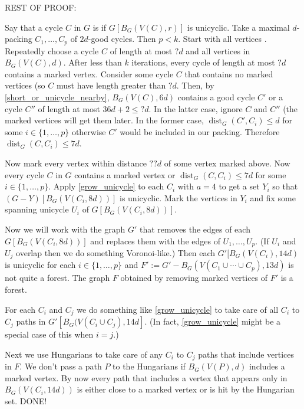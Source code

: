 \documentclass{patmorin}
\DeclareMathOperator{\dist}{dist}
\begin{document}
REST OF PROOF:

Say that a cycle $C$ in $G$ is  if $G[B_G(V(C),r)]$ is unicyclic.  Take a maximal $d$-packing $C_1,\ldots,C_p$ of $2d$-good cycles.  Then $p< k$. Start with all vertices .  Repeatedly choose a cycle $C$ of length at most $?d$ and  all vertices in $B_G(V(C),d)$.  After less than $k$ iterations, every cycle of length at most $?d$ contains a marked vertex.  Consider some cycle $C$ that contains no marked vertices (so $C$ must have length greater than $?d$.  Then, by \cref{short_or_unicycle_nearby}, $B_G(V(C),6d)$ contains a good cycle $C'$ or a cycle $C''$ of length at most $36d+2\le ?d$.  In the latter case, ignore $C$ and $C''$ (the marked vertices will get them later.  In the former case, $\dist_G(C',C_i)\le d$ for some $i\in\{1,\ldots,p\}$ otherwise $C'$ would be included in our packing.  Therefore $\dist_G(C,C_i)\le 7d$.

Now mark every vertex within distance $??d$ of some vertex marked above.  Now every cycle $C$ in $G$ contains a marked vertex or $\dist_G(C,C_i)\le 7d$ for some $i\in\{1,\ldots,p\}$.  Apply \cref{grow_unicycle} to each $C_i$ with $a=4$ to get a set $Y_i$ so that $(G-Y)[B_G(V(C_i,8d))]$ is unicyclic.  Mark the vertices in $Y_i$ and fix some spanning unicycle $U_i$ of $G[B_G(V(C_i,8d))]$.

Now we will work with the graph $G'$ that removes the edges of each $G[B_G(V(C_i,8d))]$ and replaces them with the edges of $U_1,\ldots,U_p$.  (If $U_i$ and $U_j$ overlap then we do something Voronoi-like.)  Then each $G'[B_G(V(C_i),14d)$ is unicyclic for each $i\in\{1,\ldots,p\}$ and $F':=G'-B_G(V(C_1\cup\cdots\cup C_p),13d)$ is not quite a forest. The graph $F$ obtained by removing marked vertices of $F'$ is a forest.

For each $C_i$ and $C_j$ we do something like \cref{grow_unicycle} to take care of all $C_i$ to $C_j$ paths in $G'[B_G(V(C_i\cup C_j),14d]$.  (In fact, \cref{grow_unicycle} might be a special case of this when $i=j$.)

Next we use Hungarians to take care of any $C_i$ to $C_j$ paths that include vertices in $F$. We don't pass a path $P$ to the Hungarians if $B_G(V(P),d)$ includes a marked vertex.  By now every path that includes a vertex that appears only in $B_G(V(C_i,14d))$ is either close to a marked vertex or is hit by the Hungarian set. DONE!
\end{document}
